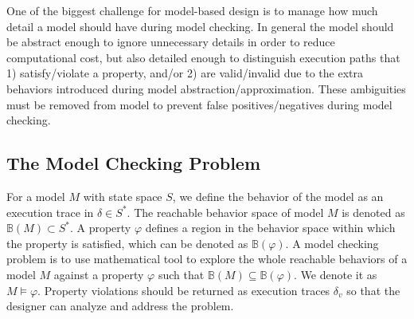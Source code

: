 One of the biggest challenge for model-based design is to manage how much detail a model should have during model checking. In general the model should be abstract enough to ignore unnecessary details in order to reduce computational cost, but also detailed enough to distinguish execution paths that 1) satisfy/violate a property, and/or 2) are valid/invalid due to the extra behaviors introduced during model abstraction/approximation. These ambiguities must be removed from model to prevent false positives/negatives during model checking. 
%
%

\subsection{The Model Checking Problem}
\label{MCproblem}
For a model $M$ with state space $S$, we define the behavior of the model as an execution trace in $\delta\in S^*$. The reachable behavior space of model $M$ is denoted as $\mathbb{B}(M)\subset S^*$. A property $\varphi$ defines a region in the behavior space within which the property is satisfied, which can be denoted as $\mathbb{B}(\varphi)$. A model checking problem is to use mathematical tool to explore the whole reachable behaviors of a model $M$ against a property $\varphi$ such that $\mathbb{B}(M)\subseteq \mathbb{B}(\varphi)$. We denote it as $M\models\varphi$. Property violations should be returned as execution traces $\delta_v$ so that the designer can analyze and address the problem. 

